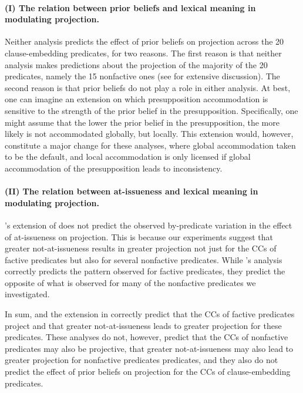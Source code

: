 \documentclass[11pt,fleqn]{article}
\newcommand{\6}{\mbox{$[\hspace*{-.6mm}[$}}
\newcommand{\9}{\mbox{$]\hspace*{-.6mm}]$}}
\newcommand{\citepos}[1]{\citeauthor{#1}'s \citeyear{#1}}
\begin{document}
\paragraph{(I) The relation between prior beliefs and lexical meaning in modulating projection.}
Neither analysis predicts the effect of prior beliefs on projection across the 20 clause-embedding predicates, for two reasons. The first reason is that neither analysis makes predictions about the projection of the majority of the 20 predicates, namely the 15 nonfactive ones (see \citealt{degen-tonhauser-language} for extensive discussion). The second reason is that prior beliefs do not play a role in either analysis. At best, one can imagine an extension on which presupposition accommodation is sensitive to the strength of the prior belief in the presupposition. Specifically, one might assume that the lower the prior belief in the presupposition, the more likely is not accommodated globally, but locally. This extension would, however, constitute a major change for these analyses, where global accommodation taken to be the default, and local accommodation is only licensed if global accommodation of the presupposition leads to inconsistency.

\paragraph{(II) The relation between at-issueness and lexical meaning in modulating projection.} \citepos{djaerv-bacovcin2020} extension of \citealt{heim83} does not predict the observed by-predicate variation in the effect of at-issueness on projection. This is because our experiments suggest that greater not-at-issueness results in greater projection not just for the CCs of factive predicates but also for several nonfactive predicates. While \citepos{djaerv-bacovcin2020} analysis correctly predicts the pattern observed for factive predicates, they predict the opposite of what is observed for many of the nonfactive predicates we investigated.

\bigskip

In sum, \citealt{heim83} and the extension in \citealt{djaerv-bacovcin2020} correctly predict that the CCs of factive predicates project and that greater not-at-issueness leads to greater projection for these predicates. These analyses do not, however, predict that the CCs of nonfactive predicates may also be projective, that greater not-at-issueness may also lead to greater projection for nonfactive predicates predicates, and they also do not predict the effect of prior beliefs on projection for the CCs of clause-embedding predicates.
\end{document}
